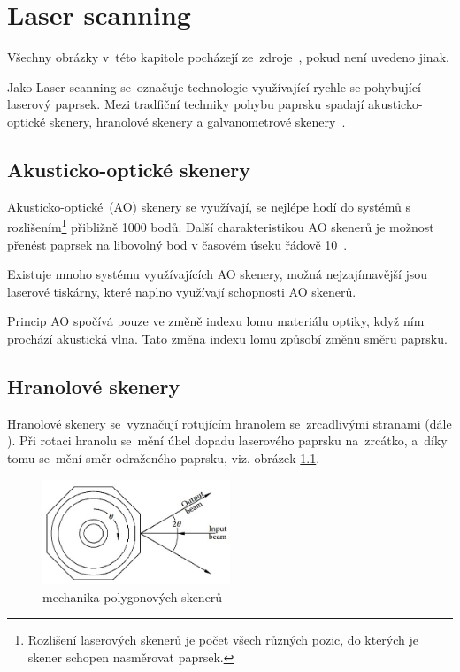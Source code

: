 \chapter{Laser scanning~\cite{scanning-handbook}}
Všechny obrázky v~této kapitole pocházejí ze~zdroje~\cite{scanning-handbook}, pokud není uvedeno jinak.

Jako Laser scanning se~označuje technologie využívající rychle se pohybující laserový paprsek. Mezi tradfiční techniky pohybu paprsku spadají akusticko-optické skenery, hranolové skenery a galvanometrové skenery~\cite{mems-review}.

\section{Akusticko-optické skenery}
Akusticko-optické~(AO) skenery se využívají, se nejlépe hodí do systémů s rozlišením\footnote{Rozlišení laserových skenerů je počet všech různých pozic, do kterých je skener schopen nasměrovat paprsek.} přibližně 1000 bodů.
Další charakteristikou AO skenerů je možnost přenést paprsek na libovolný bod v časovém úseku řádově 10~\mu.

Existuje mnoho systému využívajících AO skenery, možná nejzajímavější jsou laserové tiskárny, které naplno využívají schopnosti AO skenerů.

Princip AO spočívá pouze ve změně indexu lomu materiálu optiky, když ním prochází akustická vlna. Tato změna indexu lomu způsobí změnu směru paprsku.

\section{Hranolové skenery}
Hranolové skenery se~vyznačují rotujícím hranolem se~zrcadlivými stranami (dále ). Při rotaci hranolu se~mění úhel dopadu laserového paprsku na~zrcátko, a~díky tomu se~mění směr odraženého paprsku, viz. obrázek \ref{fig:polygon-scanner}. 

\begin{figure}[H]
  \centering
  \includegraphics[width=0.5\textwidth]{img/polygon-scanner.jpg}
  \caption{\label{fig:polygon-scanner} mechanika polygonových skenerů}
\end{figure}

